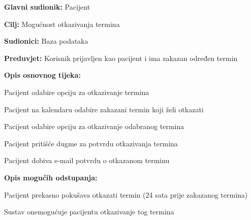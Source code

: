 					\noindent {}
					\begin{packed_item}
						
						\item \textbf{Glavni sudionik: }Pacijent
						\item  \textbf{Cilj:} Mogućnost otkazivanja termina 
						\item  \textbf{Sudionici:} Baza podataka
						\item  \textbf{Preduvjet:} Korisnik prijavljen kao pacijent i ima zakazan određen termin
						\item  \textbf{Opis osnovnog tijeka:}
						
						\item[] \begin{packed_enum}
							
							\item Pacijent odabire opciju za otkazivanje termina
							\item Pacijent na kalendaru odabire zakazani termin koji želi otkazati
							\item Pacijent odabire opciju za otkazivanje odabranog termina
							\item Pacijent pritišće dugme za potvrdu otkazivanja termina
							\item Pacijent dobiva e-mail potvrdu o otkazanom terminu
						\end{packed_enum}
						
						\item  \textbf{Opis mogućih odstupanja:}
						
						\item[] \begin{packed_item}
							
							\item[3.a] Pacijent prekasno pokušava otkazati termin (24 sata prije zakazanog termina)
							\item[] \begin{packed_enum}
								
								\item Sustav onemogućuje pacijentu otkazivanje tog termina
								
							\end{packed_enum}
							
						\end{packed_item}
					\end{packed_item}
					
